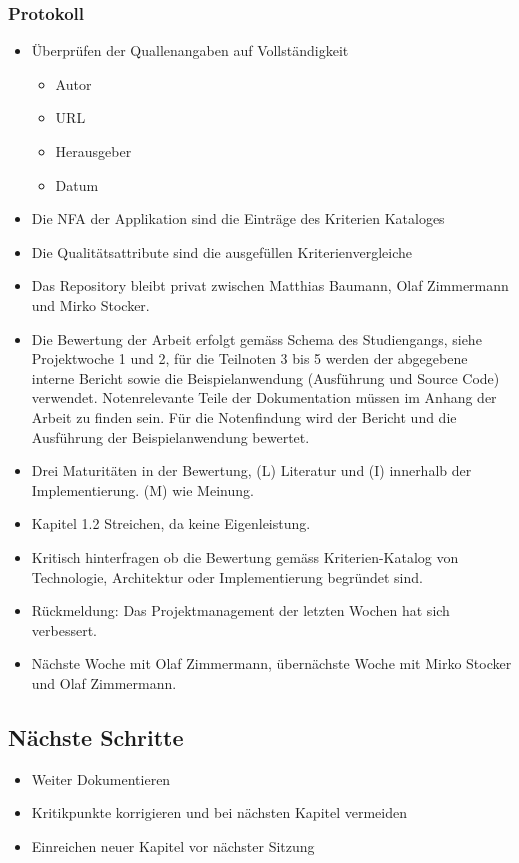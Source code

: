 \documentclass{article}
\begin{document}
\subsubsection{Protokoll}
\begin{itemize}
    \item Überprüfen der Quallenangaben auf Vollständigkeit
        \begin{itemize}
            \item Autor
            \item URL
            \item Herausgeber
            \item Datum
        \end{itemize}
    \item Die NFA der Applikation sind die Einträge des Kriterien Kataloges
    \item Die Qualitätsattribute sind die ausgefüllen Kriterienvergleiche
     \item Das Repository bleibt privat zwischen Matthias Baumann, Olaf Zimmermann und Mirko Stocker.
     \item Die Bewertung der Arbeit erfolgt gemäss Schema des Studiengangs, siehe Projektwoche 1 und 2, für die Teilnoten 3 bis 5 werden der abgegebene interne Bericht sowie die Beispielanwendung (Ausführung und Source Code) verwendet. Notenrelevante Teile der Dokumentation müssen im Anhang der Arbeit zu finden sein. Für die Notenfindung wird der Bericht und die Ausführung der Beispielanwendung bewertet.
    \item Drei Maturitäten in der Bewertung, (L) Literatur und (I) innerhalb der Implementierung. (M) wie Meinung.
    \item Kapitel 1.2 Streichen, da keine Eigenleistung.
    \item Kritisch hinterfragen ob die Bewertung gemäss Kriterien-Katalog von Technologie, Architektur oder Implementierung begründet sind.
    \item Rückmeldung: Das Projektmanagement der letzten Wochen hat sich verbessert.
    \item Nächste Woche mit Olaf Zimmermann, übernächste Woche mit Mirko Stocker und Olaf Zimmermann.
\end{itemize}
\subsection{Nächste Schritte}
\begin{itemize}
    \item Weiter Dokumentieren
    \item Kritikpunkte korrigieren und bei nächsten Kapitel vermeiden
    \item Einreichen neuer Kapitel vor nächster Sitzung
\end{itemize}
\end{document}
